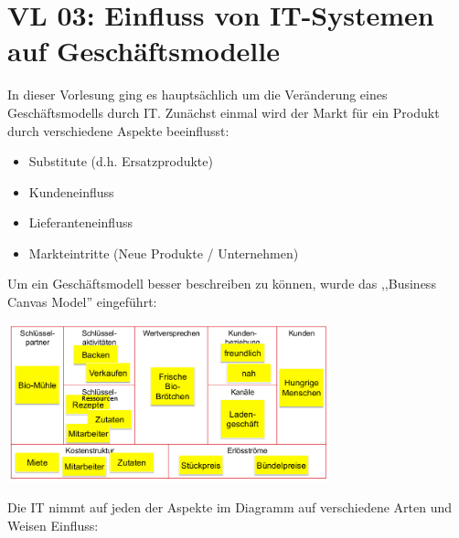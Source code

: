 \newpage
\section{VL 03: Einfluss von IT-Systemen auf Geschäftsmodelle}

In dieser Vorlesung ging es hauptsächlich um die Veränderung eines Geschäftsmodells durch IT. Zunächst einmal wird der Markt für ein Produkt durch verschiedene Aspekte beeinflusst:

\begin{itemize}

    \item Substitute (d.h. Ersatzprodukte)

    \item Kundeneinfluss

    \item Lieferanteneinfluss

    \item Markteintritte (Neue Produkte / Unternehmen)

\end{itemize}

Um ein Geschäftsmodell besser beschreiben zu können, wurde das ,,Business Canvas Model'' eingeführt:

\begin{center}\includegraphics[width=0.7\textwidth]{BCM.png}\end{center}

Die IT nimmt auf jeden der Aspekte im Diagramm auf verschiedene Arten und Weisen Einfluss:

